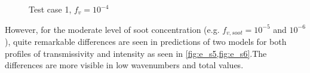 \documentclass[3p]{elsarticle}
\begin{document}
\begin{figure}[p]
	\centering{}
	\par\medskip		
	\centering{}
	\caption{Test case 1, \({f_v=10^{-4}}\)} \label{fig:e_s4}
\end{figure}

\pagebreak
 
However, for the moderate level of soot concentration (e.g. \(f_{v,soot}=10^{-5}\) and \(10^{-6}\)), quite remarkable differences are seen in predictions of two models for both profiles of transmissivity and intensity as seen in \cref{fig:e_s5,fig:e_s6}.The differences are more visible in low wavenumbers and total values.
\end{document}
